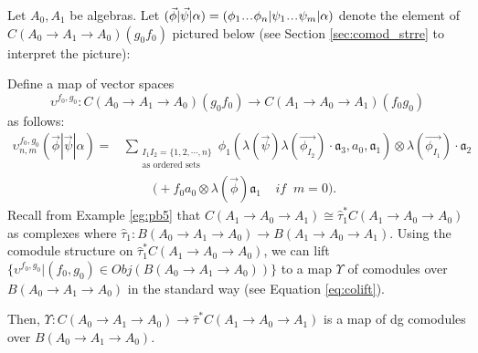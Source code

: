 \begin{prop}
\label{prop:c1}
Let $A_0, A_1$ be algebras. 
Let $(\vec{\phi} | \vec{\psi} | \alpha) = 
(\phi_1\smdots\phi_n | \psi_1\smdots\psi_m| \alpha)$ 
denote 
the element of $C(A_0 \to A_1 \to A_0)(g_0f_0)$ 
pictured below (see Section \ref{sec:comod_strre} 
to interpret the picture): 
%
\begin{figure}[H]
\centerline{}
\end{figure}
%
Define a map of vector spaces 
$$
\upsilon^{f_0, g_0}: C(A_0 \to A_1 \to A_0)(g_0f_0) 
\longrightarrow C(A_1 \to A_0 \to A_1)(f_0g_0)
$$ 
as follows: 
\begin{align*}
\upsilon_{n,m}^{f_0,g_0} 
(\vec{\phi} | \vec{\psi} | \alpha) = 
& \sum_{\substack{I_1I_2 = \{1,2,\cdots,n\} \\
                          \textrm{as ordered sets}}}
  \phi_1(\lambda(\vec{\psi})\lambda(\vec{\phi_{I_2}})\cdot \mathfrak{a}_3, a_0, \mathfrak{a}_1) \otimes \lambda(\vec{\phi_{I_1}}) \cdot \mathfrak{a}_2 \\
&\phantom{{}move{}}
\bigg( + f_0a_0 \otimes \lambda(\vec{\phi}) \mathfrak{a}_1 
  \; \; \; \; if \; \; m = 0 \bigg).
\end{align*}
Recall from Example \ref{eg:pb5} that 
$C(A_1 \to A_0 \to A_1) \cong 
\hat{\tau}_1^*C(A_1 \to A_0 \to A_0)$ 
as complexes where $\hat{\tau}_1: 
B(A_0 \to A_1 \to A_0) 
\longrightarrow B(A_1 \to A_0 \to A_1)$. 
Using the comodule structure 
on $\hat{\tau}_1^*C(A_1 \to A_0 \to A_0)$, 
we can lift $\{\upsilon^{f_0,g_0}| 
(f_0, g_0) \in Obj(B(A_0 \to A_1 \to A_0))\}$ 
to a map $\Upsilon$
of comodules over 
$B(A_0 \to A_1 \to A_0)$ in the standard way
(see Equation \ref{eq:colift}).

Then, $\Upsilon: C(A_0 \to A_1 \to A_0)
\to \hat{\tau}^*C(A_1 \to A_0 \to A_1)$ 
is a map of dg comodules over 
$B(A_0 \to A_1 \to A_0)$.
\end{prop}
%
